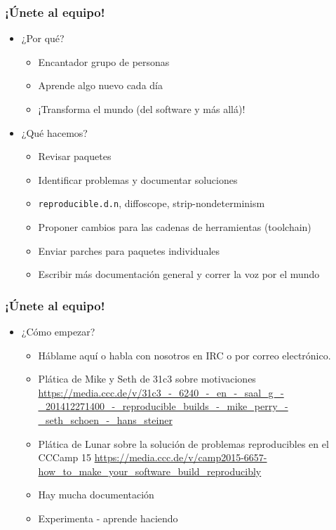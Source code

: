 \documentclass[14pt,aspectratio=169]{beamer}
\begin{document}
\begin{frame}
 \frametitle{¡Únete al equipo!}

 \begin{itemize}
  \item ¿Por qué?
   \begin{itemize}
    \item Encantador grupo de personas
    \item Aprende algo nuevo cada día
    \item ¡Transforma el mundo (del software y más allá)!
   \end{itemize}
  \item ¿Qué hacemos?
   \begin{itemize}
    \item Revisar paquetes
    \item Identificar problemas y documentar soluciones
    \item \texttt{reproducible.d.n}, diffoscope, strip-nondeterminism
    \item Proponer cambios para las cadenas de herramientas (toolchain)
    \item Enviar parches para paquetes individuales
    \item Escribir más documentación general y correr la voz por el mundo
   \end{itemize}
 \end{itemize}
\end{frame}

\begin{frame}
 \frametitle{¡Únete al equipo!}

\begin{itemize}
    \item ¿Cómo empezar?
   \begin{itemize}
    \item Háblame aquí o habla con nosotros en IRC o por correo electrónico.
    \item Plática de Mike y Seth de 31c3 sobre motivaciones \url{https://media.ccc.de/v/31c3_-_6240_-_en_-_saal_g_-_201412271400_-_reproducible_builds_-_mike_perry_-_seth_schoen_-_hans_steiner}
    \item Plática de Lunar sobre la solución de problemas reproducibles en el CCCamp 15 \url{https://media.ccc.de/v/camp2015-6657-how_to_make_your_software_build_reproducibly}
    \item Hay mucha documentación
    \item Experimenta - aprende haciendo
   \end{itemize}
 \end{itemize}
\end{frame}
\end{document}
